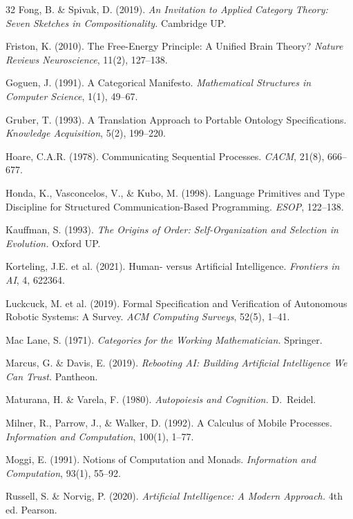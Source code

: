 \documentclass[11pt,a4paper]{article}
\begin{document}
\begin{thebibliography}{32}
Fong, B. \& Spivak, D. (2019).
\textit{An Invitation to Applied Category Theory: Seven Sketches in Compositionality.}
Cambridge UP.

Friston, K. (2010).
The Free-Energy Principle: A Unified Brain Theory?
\textit{Nature Reviews Neuroscience}, 11(2), 127--138.

Goguen, J. (1991).
A Categorical Manifesto.
\textit{Mathematical Structures in Computer Science}, 1(1), 49--67.

Gruber, T. (1993).
A Translation Approach to Portable Ontology Specifications.
\textit{Knowledge Acquisition}, 5(2), 199--220.

Hoare, C.A.R. (1978).
Communicating Sequential Processes.
\textit{CACM}, 21(8), 666--677.

Honda, K., Vasconcelos, V., \& Kubo, M. (1998).
Language Primitives and Type Discipline for Structured Communication-Based Programming.
\textit{ESOP}, 122--138.

Kauffman, S. (1993).
\textit{The Origins of Order: Self-Organization and Selection in Evolution.}
Oxford UP.

Korteling, J.E. et al. (2021).
Human- versus Artificial Intelligence.
\textit{Frontiers in AI}, 4, 622364.

Luckcuck, M. et al. (2019).
Formal Specification and Verification of Autonomous Robotic Systems: A Survey.
\textit{ACM Computing Surveys}, 52(5), 1--41.

Mac Lane, S. (1971).
\textit{Categories for the Working Mathematician.}
Springer.

Marcus, G. \& Davis, E. (2019).
\textit{Rebooting AI: Building Artificial Intelligence We Can Trust.}
Pantheon.

Maturana, H. \& Varela, F. (1980).
\textit{Autopoiesis and Cognition.}
D.~Reidel.

Milner, R., Parrow, J., \& Walker, D. (1992).
A Calculus of Mobile Processes.
\textit{Information and Computation}, 100(1), 1--77.

Moggi, E. (1991).
Notions of Computation and Monads.
\textit{Information and Computation}, 93(1), 55--92.

Russell, S. \& Norvig, P. (2020).
\textit{Artificial Intelligence: A Modern Approach.} 4th ed.
Pearson.


\end{thebibliography}
\end{document}
